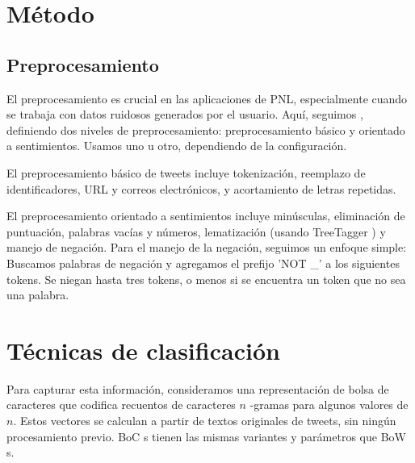 \subsubsection{}

\section{Método}

\subsection {Preprocesamiento}


\newcommand{\elmo}[0]{ELMo}
\newcommand{\elmomodel}[0]{\emph{LSTM-\elmo{}}}
\newcommand{\bow}[0]{BoW}
\newcommand{\boc}[0]{BoC}
\newcommand{\elmobowmodel}[0]{\emph{LSTM-\elmo{}+\bow{}}}
\newcommand{\svmmodel}[0]{$\mathrm{SVM}_0$}
\newcommand{\hateval}[0]{HatEval}
\newcommand{\semeval}[0]{SemEval-2019}
\newcommand{\fasttext}[0]{\emph{fastText}}

El preprocesamiento es crucial en las aplicaciones de PNL, especialmente cuando se trabaja con datos ruidosos generados por el usuario. Aquí, seguimos \citet{atalaya_tass2018}, definiendo dos niveles de preprocesamiento: preprocesamiento básico y orientado a sentimientos. Usamos uno u otro, dependiendo de la configuración.

El preprocesamiento básico de tweets incluye tokenización, reemplazo de identificadores, URL y correos electrónicos, y acortamiento de letras repetidas.

El preprocesamiento orientado a sentimientos incluye minúsculas, eliminación de puntuación, palabras vacías y números, lematización (usando TreeTagger \cite{schmid95}) y manejo de negación.
Para el manejo de la negación, seguimos un enfoque simple:
Buscamos palabras de negación y agregamos el prefijo 'NOT \_' a los siguientes tokens. Se niegan hasta tres tokens, o menos si se encuentra un token que no sea una palabra.

\section{Técnicas de clasificación}

Para capturar esta información, consideramos una representación de bolsa de caracteres que codifica recuentos de caracteres $n$ -gramas para algunos valores de $ n $. Estos vectores se calculan a partir de textos originales de tweets, sin ningún procesamiento previo. \boc {} s tienen las mismas variantes y parámetros que \bow {} s.


